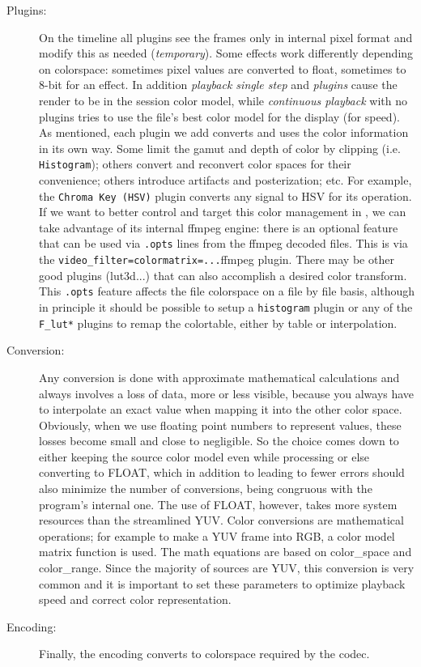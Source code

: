 \begin{description}
	\item[Plugins:] On the timeline all plugins see the frames only in internal pixel format and modify this as needed (\textit{temporary}). Some effects work differently depending on colorspace: sometimes pixel values are converted to float, sometimes to 8-bit for an effect. In addition \textit{playback single step} and \textit{plugins} cause the render to be in the session color model, while \textit{continuous playback} with no plugins tries to use the file’s best color model for the display (for speed). As mentioned, each plugin we add converts and uses the color information in its own way. Some limit the gamut and depth of color by clipping (i.e. \texttt{Histogram}); others convert and reconvert color spaces for their convenience; others introduce artifacts and posterization; etc. For example, the \texttt{Chroma Key (HSV)} plugin converts any signal to HSV for its operation.
	If we want to better control and target this color management in \CGG{}, we can take advantage of its internal ffmpeg engine: there is an optional feature that can be used via \texttt{.opts} lines from the ffmpeg decoded files. This is via the \texttt{video\_filter=colormatrix=...}ffmpeg plugin. There may be other good plugins (lut3d...) that can also accomplish a desired color transform. This \texttt{.opts} feature affects the file colorspace on a file by file basis, although in principle it should be possible to setup a \texttt{histogram} plugin or any of the \texttt{F\_lut*} plugins to remap the colortable, either by table or interpolation.
	\item[Conversion:] Any conversion is done with approximate mathematical calculations and always involves a loss of data, more or less visible, because you always have to interpolate an exact value when mapping it into the other color space. Obviously, when we use floating point numbers to represent values, these losses become small and close to negligible. So the choice comes down to either keeping the source color model even while processing or else converting to FLOAT, which in addition to leading to fewer errors should also minimize the number of conversions, being congruous with the program's internal one. The use of FLOAT, however, takes more system resources than the streamlined YUV. Color conversions are mathematical operations; for example to make a YUV frame into RGB, a color model matrix function is used. The math equations are based on color\_space and color\_range. Since the majority of sources are YUV, this conversion is very common and it is important to set these parameters to optimize playback speed and correct color representation.
	\item[Encoding:] Finally, the encoding converts to colorspace required by the codec.
\end{description}

